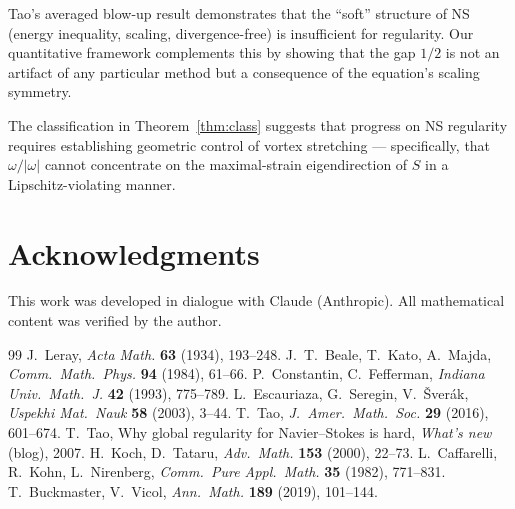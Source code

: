 \documentclass[12pt]{article}
\begin{document}
Tao's averaged blow-up result \cite{tao2016}
demonstrates that the ``soft'' structure of NS
(energy inequality, scaling, divergence-free)
is insufficient for regularity.
Our quantitative framework complements this
by showing that the gap $1/2$ is not an artifact
of any particular method but a consequence of
the equation's scaling symmetry.

The classification in Theorem~\ref{thm:class}
suggests that progress on NS regularity requires
establishing geometric control of vortex stretching
--- specifically, that $\omega/|\omega|$ cannot
concentrate on the maximal-strain eigendirection
of $S$ in a Lipschitz-violating manner.

\section*{Acknowledgments}
This work was developed in dialogue with
Claude (Anthropic). All mathematical content
was verified by the author.

\begin{thebibliography}{99}
 J.~Leray,
\textit{Acta Math.} \textbf{63} (1934), 193--248.
 J.~T.~Beale, T.~Kato, A.~Majda,
\textit{Comm.\ Math.\ Phys.} \textbf{94} (1984), 61--66.
 P.~Constantin, C.~Fefferman,
\textit{Indiana Univ.\ Math.\ J.} \textbf{42} (1993), 775--789.
 L.~Escauriaza, G.~Seregin, V.~\v{S}ver\'ak,
\textit{Uspekhi Mat.\ Nauk} \textbf{58} (2003), 3--44.
 T.~Tao,
\textit{J.\ Amer.\ Math.\ Soc.} \textbf{29} (2016), 601--674.
 T.~Tao,
Why global regularity for Navier--Stokes is hard,
\textit{What's new} (blog), 2007.
 H.~Koch, D.~Tataru,
\textit{Adv.\ Math.} \textbf{153} (2000), 22--73.
 L.~Caffarelli, R.~Kohn, L.~Nirenberg,
\textit{Comm.\ Pure Appl.\ Math.} \textbf{35} (1982), 771--831.
 T.~Buckmaster, V.~Vicol,
\textit{Ann.\ Math.} \textbf{189} (2019), 101--144.
\end{thebibliography}
\end{document}

